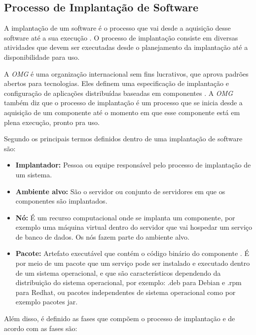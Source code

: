 \subsection{Processo de Implantação de Software}
\label{sub:processoimplantacao}

A implantação de um software é o processo que vai desde a aquisição desse software
até a sua execução \cite{leo2014}. O processo de implantação consiste em diversas
atividades que devem ser executadas desde o planejamento da implantação até a
disponibilidade para uso.

A \textit{OMG} é uma organização internacional sem fins lucrativos,
que aprova padrões abertos para tecnologias. Eles definem uma especificação de
implantação e configuração de aplicações distribuídas baseadas em componentes \cite{omg2006}. 
A \textit{OMG} também diz que o processo de implantação é um processo que se inicia desde
a aquisição de um componente até o momento em que esse componente está em plena
execução, pronto pra uso.

Segundo  os principais termos definidos dentro de uma implantação
de software são:

\begin{itemize}
  \item  \textbf{Implantador:} Pessoa ou equipe responsável pelo processo de
  implantação  de um sistema.
  \item  \textbf{Ambiente alvo:} São o servidor ou conjunto de servidores em
  que os componentes são implantados.
  \item  \textbf{Nó:} É um recurso computacional onde se implanta um componente,
  por exemplo uma máquina virtual dentro do servidor que vai hospedar um serviço
  de banco de dados. Os nós fazem parte do ambiente alvo.
  \item  \textbf{Pacote:} Artefato executável que contém o código binário do componente
  . É por meio de um pacote que um serviço pode ser instalado e executado dentro
  de um sistema operacional, e que são característicos dependendo da distribuição
  do sistema operacional, por exemplo: .deb para Debian e .rpm para Redhat, ou
  pacotes independentes de sistema operacional como por exemplo pacotes jar.
\end{itemize}

Além disso, é definido as fases que compõem o processo de implantação e de acordo
com  as fases são:

